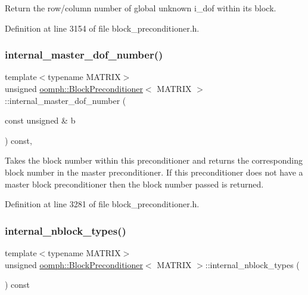 Return the row/column number of global unknown i\+\_\+dof within it\textquotesingle{}s block. 



Definition at line 3154 of file block\+\_\+preconditioner.\+h.

\mbox{\label{classoomph_1_1BlockPreconditioner_a7297e4d24c2c7ae7af6a9ad009669928}} 
\subsubsection{\texorpdfstring{internal\+\_\+master\+\_\+dof\+\_\+number()}{internal\_master\_dof\_number()}}
{\footnotesize\ttfamily template$<$typename M\+A\+T\+R\+IX$>$ \\
unsigned \hyperlink{classoomph_1_1BlockPreconditioner}{oomph\+::\+Block\+Preconditioner}$<$ M\+A\+T\+R\+IX $>$\+::internal\+\_\+master\+\_\+dof\+\_\+number (\begin{DoxyParamCaption}\item[{const unsigned \&}]{b }\end{DoxyParamCaption}) const\hspace{0.3cm}{\ttfamily [inline]}, {\ttfamily [protected]}}



Takes the block number within this preconditioner and returns the corresponding block number in the master preconditioner. If this preconditioner does not have a master block preconditioner then the block number passed is returned. 



Definition at line 3281 of file block\+\_\+preconditioner.\+h.

\mbox{\label{classoomph_1_1BlockPreconditioner_a7c2b9ed482db072b0cabe5a51eb76efa}} 
\subsubsection{\texorpdfstring{internal\+\_\+nblock\+\_\+types()}{internal\_nblock\_types()}}
{\footnotesize\ttfamily template$<$typename M\+A\+T\+R\+IX$>$ \\
unsigned \hyperlink{classoomph_1_1BlockPreconditioner}{oomph\+::\+Block\+Preconditioner}$<$ M\+A\+T\+R\+IX $>$\+::internal\+\_\+nblock\+\_\+types (\begin{DoxyParamCaption}{ }\end{DoxyParamCaption}) const\hspace{0.3cm}{\ttfamily [inline]}}



